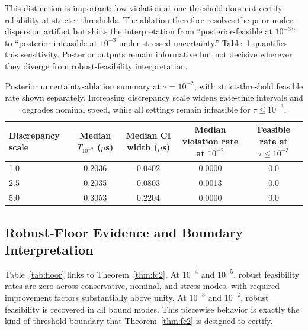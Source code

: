 \documentclass{article} %
\begin{document}
This distinction is important: low violation at one threshold does not certify reliability at stricter thresholds. The ablation therefore resolves the prior under-dispersion artifact but shifts the interpretation from ``posterior-feasible at $10^{-3}$'' to ``posterior-infeasible at $10^{-3}$ under stressed uncertainty.'' Table~\ref{tab:h4ablation} quantifies this sensitivity. Posterior outputs remain informative but not decisive wherever they diverge from robust-feasibility interpretation.

\begin{table}[t]
\caption{Posterior uncertainty-ablation summary at $\tau=10^{-2}$, with strict-threshold feasible rate shown separately. Increasing discrepancy scale widens gate-time intervals and degrades nominal speed, while all settings remain infeasible for $\tau\le 10^{-3}$.}
\label{tab:h4ablation}
\centering
\small
\renewcommand{\arraystretch}{1.1}
\setlength{\tabcolsep}{4pt}
\begin{tabular}{lcccc}
\hline
Discrepancy scale & Median $T_{10^{-2}}$ ($\mu$s) & Median CI width ($\mu$s) & Median violation rate at $10^{-2}$ & Feasible rate at $\tau\le 10^{-3}$ \\
\hline
1.0 & 0.2036 & 0.0402 & 0.0000 & 0.0 \\
2.5 & 0.2035 & 0.0803 & 0.0013 & 0.0 \\
5.0 & 0.3053 & 0.2204 & 0.0000 & 0.0 \\
\hline
\end{tabular}
\end{table}

\subsection{Robust-Floor Evidence and Boundary Interpretation}
Table~\ref{tab:floor} links to Theorem~\ref{thm:fc2}. At $10^{-4}$ and $10^{-5}$, robust feasibility rates are zero across conservative, nominal, and stress modes, with required improvement factors substantially above unity. At $10^{-3}$ and $10^{-2}$, robust feasibility is recovered in all bound modes. This piecewise behavior is exactly the kind of threshold boundary that Theorem~\ref{thm:fc2} is designed to certify.
\end{document}
